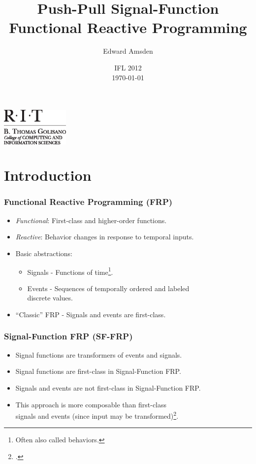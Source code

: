 \documentclass{beamer}
\title{Push-Pull Signal-Function Functional Reactive Programming}
\author{Edward Amsden}
\institute{Rochester Institute of Technology}
\date{IFL 2012\\ \today}
\begin{document}
\AtBeginSection[]
{
\begin{frame}
\end{frame}
}

\begin{frame}[plain]
\titlepage
\includegraphics[width=9em]{RIT_GCCIS1}
\end{frame}


\section{Introduction}

\begin{frame}
\frametitle{Functional Reactive Programming (FRP)}
    \begin{itemize}
        \item {\em Functional}: First-class and higher-order functions.
        \item {\em Reactive}: Behavior changes in response to temporal inputs.
        \item Basic abstractions:
        \begin{itemize}
            \item Signals - Functions of time\footnote{Often also called behaviors.}.
            \item Events - Sequences of temporally ordered and labeled\\
                  discrete values.
        \end{itemize}
    \item ``Classic'' FRP - Signals and events are first-class.
    \end{itemize}
\end{frame}

\begin{frame}
\frametitle{Signal-Function FRP (SF-FRP)}
    \begin{itemize}
        \item Signal functions are transformers of events and signals.
        \item Signal functions are first-class in Signal-Function FRP.
        \item Signals and events are not first-class in Signal-Function FRP.
        \item This approach is more composable than first-class\\
              signals and events (since input may be transformed)\footcite{Courtney2001-1}.
    \end{itemize}
\end{frame}
\end{document}
